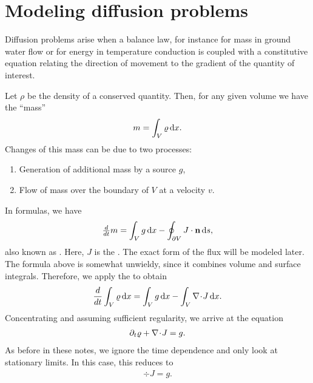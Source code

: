 
\section{Modeling diffusion problems}

\begin{intro}
  Diffusion problems arise when a balance law, for instance for mass
  in ground water flow or for energy in temperature conduction is
  coupled with a constitutive equation relating the direction of
  movement to the gradient of the quantity of interest.
\end{intro}

\begin{intro}
  Let $\rho$ be the density of a conserved quantity. Then, for any given
  volume we have the ``mass''
  \begin{gather}
    m = \int_V \varrho\,\mathrm{d} x.
  \end{gather}
  Changes of this mass can be due to two processes:
  \begin{enumerate}
  \item Generation of additional mass by a source $g$,
  \item Flow of mass over the boundary of $V$ at a velocity $v$.
  \end{enumerate}
  In formulas, we have
  \begin{gather}
    \tfrac{d}{d t} m = \int_V g\,\mathrm{d} x - \oint_{\partial V} J\cdot \mathbf n \,\mathrm{d} s,
  \end{gather}
  also known as . Here, $J$ is the
  . The exact form of the flux will be modeled later.
  The formula above is somewhat unwieldy, since it combines volume and
  surface integrals. Therefore, we apply the 
  to obtain
  \begin{gather}
    \label{eq:darcy:2}
    \frac{d}{dt} \int_V \varrho\,\mathrm{d} x = \int_V g\,\mathrm{d} x - \int_V \nabla\!\cdot\! J \,\mathrm{d} x.
  \end{gather}
  Concentrating and assuming sufficient regularity, we arrive at the
  equation
  \begin{gather}
    \label{eq:darcy:3}
    \partial_t \varrho + \nabla\!\cdot\! J = g.
  \end{gather}
  As before in these notes, we ignore the time dependence and only
  look at stationary limits. In this case, this reduces to
  \begin{gather}
    \label{eq:darcy:4}
    \div J = g.
  \end{gather}
\end{intro}

